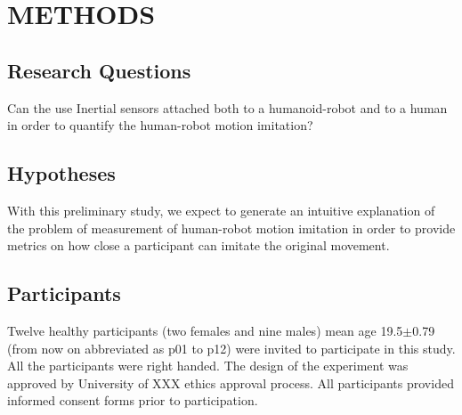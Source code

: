 \documentclass{sig-alternate-05-2015}
\begin{document}
% 
% 
% 







\section{METHODS}

\subsection{Research Questions}

Can the use Inertial sensors attached  
both to a humanoid-robot and to a human in order to quantify the human-robot motion imitation?


\subsection{Hypotheses}
With this preliminary study, we expect to generate an intuitive 
explanation of the problem of measurement of human-robot motion imitation 
in order to provide metrics on how close a participant can imitate the original
movement.



\subsection{Participants}
Twelve healthy participants (two females and nine males)
mean age 19.5$\pm$0.79 (from now on abbreviated as p01 to p12) were invited to 
participate in this study. All the participants were right handed.
The design of the experiment was approved by University of XXX ethics approval
process. All participants provided informed consent forms prior to participation.
\end{document}
